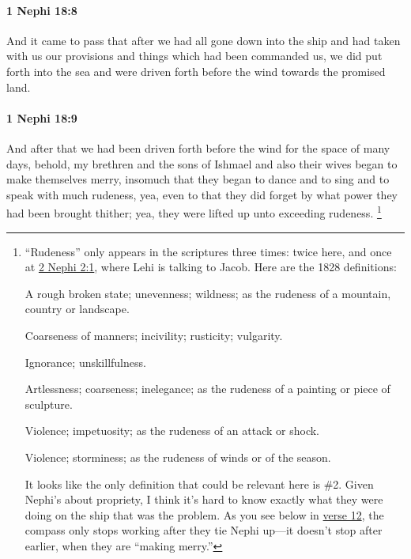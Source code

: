 		\paragraph{1 Nephi 18:8} %
			\label{1NEPHI-18-8}

			And it came to pass that after we had all gone down into the ship
			and had taken with us our provisions and things which had been commanded us,
			we did put forth into the sea and were driven forth before the wind
			towards the promised land.

		\paragraph{1 Nephi 18:9} %
			\label{1NEPHI-18-9}

			And after that we had been driven forth before the wind
			for the space of many days,
			behold, my brethren and the sons of Ishmael and also their wives
			began to make themselves merry,
			insomuch that they began to dance and to sing
			and to speak with much rudeness,
			yea, even to that they did forget by what power they had been brought thither;
			yea, they were lifted up unto exceeding rudeness.%
				\footnote{%
					\label{1NEPHI-18-9-NOTE-rudeness}%
					``Rudeness'' only appears in the scriptures three times: twice here, and once at \hyperref[2NEPHI-2-1]{2 Nephi 2:1}, where Lehi is talking to Jacob. Here are the 1828 definitions:
						\begin{compactitem}
							\item[1] A rough broken state; unevenness; wildness; as the rudeness of a mountain, country or landscape.
							\item[2] Coarseness of manners; incivility; rusticity; vulgarity.
							\item[3] Ignorance; unskillfulness.
							\item[4] Artlessness; coarseness; inelegance; as the rudeness of a painting or piece of sculpture.
							\item[5] Violence; impetuosity; as the rudeness of an attack or shock.
							\item[6] Violence; storminess; as the rudeness of winds or of the season.
						\end{compactitem}
					It looks like the only definition that could be relevant here is \#2. Given Nephi's about propriety, I think it's hard to know exactly what they were doing on the ship that was the problem. As you see below in \hyperref[1NEPHI-18-12]{verse 12}, the compass only stops working after they tie Nephi up---it doesn't stop after earlier, when they are ``making merry.''
					}

